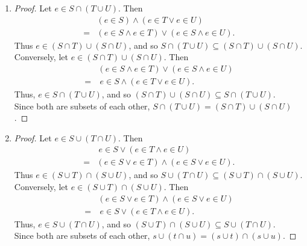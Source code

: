 \documentclass{homework}
\begin{document}
\begin{solution}
\begin{enumerate}[label=(\alph*)]
  \item
    \begin{proof}[Proof]
      Let $e\in S\cap \left( T\cup U \right) $. Then
      \begin{align*}
        &\left( e\in S \right) \land \left( e\in T \lor e\in U \right) \\
        = &\left( e\in S\land e\in T \right) \lor \left( e\in S\land e\in U \right)
      .\end{align*}
      Thus $e\in \left( S\cap T \right) \cup \left( S\cap U \right)$, and so $S\cap \left( T\cup U 
        \right) \subseteq \left( S\cap T \right) \cup \left( S\cap U \right) $.\\
      Conversely, let $e\in \left( S\cap T \right) \cup \left( S\cap U \right)$. Then
      \begin{align*}
        &\left( e\in S\land e\in T \right) \lor \left( e\in S\land e\in U \right) \\
        = &~e\in S\land \left(e\in T\lor e\in U\right)
      .\end{align*}
      Thus, $e\in S\cap \left( T\cup U \right)$, and so $\left( S\cap T
      \right) \cup \left( S\cap U \right) \subseteq S\cap \left( T\cup U \right) $. \\
      Since both are subsets of each other, $S\cap \left( T\cup U \right) = \left( S\cap T
      \right)\cup \left( S\cap U \right) $.
    \end{proof}
    
  \item
    \begin{proof}[Proof]
      Let $e\in S\cup \left( T\cap U \right)$. Then
      \begin{align*}
        &~e\in S\lor \left( e\in T\land e\in U \right) \\
        = &\left( e\in S\lor e\in T \right) \land \left( e\in S\lor e\in U \right)
      .\end{align*}
      Thus $e\in \left( S\cup T \right) \cap \left( S\cup U \right)$, and so $S\cup \left( T\cap U
        \right) \subseteq \left( S\cup T \right) \cap \left( S\cup U \right) $. \\
        Conversely, let $e\in \left( S\cup T \right) \cap \left( S\cup U \right)$. Then 
        \begin{align*}
          &\left( e\in S\lor e\in T \right) \land \left( e\in S\lor e\in U \right) \\
          =&~e\in S\lor \left( e\in T\land e\in U \right)
        .\end{align*}
      Thus, $e\in S\cup \left( T\cap U \right)$, and so $\left( S\cup T \right) \cap \left( S\cup U 
      \right) \subseteq S\cup \left( T\cap U \right) $.\\
      Since both are subsets of each other, $s\cup \left( t\cap u \right) = \left( s\cup t \right)
      \cap \left( s\cup u \right).$
    \end{proof}


\end{enumerate}
\end{solution}
\end{document}
